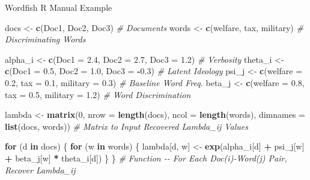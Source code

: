 \documentclass[
  ignorenonframetext,
  aspectratio=169]{beamer}
\newenvironment{Shaded}{\begin{snugshade}}{\end{snugshade}}
\newcommand{\AttributeTok}[1]{\textcolor[rgb]{0.13,0.29,0.53}{#1}}
\newcommand{\CommentTok}[1]{\textcolor[rgb]{0.56,0.35,0.01}{\textit{#1}}}
\newcommand{\ControlFlowTok}[1]{\textcolor[rgb]{0.13,0.29,0.53}{\textbf{#1}}}
\newcommand{\DecValTok}[1]{\textcolor[rgb]{0.00,0.00,0.81}{#1}}
\newcommand{\FloatTok}[1]{\textcolor[rgb]{0.00,0.00,0.81}{#1}}
\newcommand{\FunctionTok}[1]{\textcolor[rgb]{0.13,0.29,0.53}{\textbf{#1}}}
\newcommand{\NormalTok}[1]{#1}
\newcommand{\OtherTok}[1]{\textcolor[rgb]{0.56,0.35,0.01}{#1}}
\newcommand{\SpecialCharTok}[1]{\textcolor[rgb]{0.81,0.36,0.00}{\textbf{#1}}}
\newcommand{\StringTok}[1]{\textcolor[rgb]{0.31,0.60,0.02}{#1}}
\begin{document}
\begin{frame}[fragile]{Wordfish R Manual Example}
\label{wordfish-r-manual-example}
\scriptsize

\begin{Shaded}
\begin{Highlighting}[]
\NormalTok{docs }\OtherTok{\textless{}{-}} \FunctionTok{c}\NormalTok{(}\StringTok{\textquotesingle{}Doc1\textquotesingle{}}\NormalTok{, }\StringTok{\textquotesingle{}Doc2\textquotesingle{}}\NormalTok{, }\StringTok{\textquotesingle{}Doc3\textquotesingle{}}\NormalTok{) }\CommentTok{\# Documents}
\NormalTok{words }\OtherTok{\textless{}{-}} \FunctionTok{c}\NormalTok{(}\StringTok{\textquotesingle{}welfare\textquotesingle{}}\NormalTok{, }\StringTok{\textquotesingle{}tax\textquotesingle{}}\NormalTok{, }\StringTok{\textquotesingle{}military\textquotesingle{}}\NormalTok{) }\CommentTok{\# Discriminating Words}

\NormalTok{alpha\_i }\OtherTok{\textless{}{-}} \FunctionTok{c}\NormalTok{(}\AttributeTok{Doc1 =} \FloatTok{2.4}\NormalTok{, }\AttributeTok{Doc2 =} \FloatTok{2.7}\NormalTok{, }\AttributeTok{Doc3 =} \FloatTok{1.2}\NormalTok{) }\CommentTok{\# Verbosity}
\NormalTok{theta\_i }\OtherTok{\textless{}{-}} \FunctionTok{c}\NormalTok{(}\AttributeTok{Doc1 =} \FloatTok{0.5}\NormalTok{, }\AttributeTok{Doc2 =} \FloatTok{1.0}\NormalTok{, }\AttributeTok{Doc3 =} \SpecialCharTok{{-}}\FloatTok{0.3}\NormalTok{)  }\CommentTok{\# Latent Ideology}
\NormalTok{psi\_j }\OtherTok{\textless{}{-}} \FunctionTok{c}\NormalTok{(}\AttributeTok{welfare =} \FloatTok{0.2}\NormalTok{, }\AttributeTok{tax =} \FloatTok{0.1}\NormalTok{, }\AttributeTok{military =} \FloatTok{0.3}\NormalTok{)  }\CommentTok{\# Baseline Word Freq.}
\NormalTok{beta\_j }\OtherTok{\textless{}{-}} \FunctionTok{c}\NormalTok{(}\AttributeTok{welfare =} \FloatTok{0.8}\NormalTok{, }\AttributeTok{tax =} \FloatTok{0.5}\NormalTok{, }\AttributeTok{military =} \FloatTok{1.2}\NormalTok{) }\CommentTok{\# Word Discrimination}

\NormalTok{lambda }\OtherTok{\textless{}{-}} \FunctionTok{matrix}\NormalTok{(}\DecValTok{0}\NormalTok{, }\AttributeTok{nrow =} \FunctionTok{length}\NormalTok{(docs), }\AttributeTok{ncol =} \FunctionTok{length}\NormalTok{(words),}
                 \AttributeTok{dimnames =} \FunctionTok{list}\NormalTok{(docs, words)) }\CommentTok{\# Matrix to Input Recovered Lambda\_ij Values}

\ControlFlowTok{for}\NormalTok{ (d }\ControlFlowTok{in}\NormalTok{ docs) \{}
  \ControlFlowTok{for}\NormalTok{ (w }\ControlFlowTok{in}\NormalTok{ words) \{}
\NormalTok{    lambda[d, w] }\OtherTok{\textless{}{-}} \FunctionTok{exp}\NormalTok{(alpha\_i[d] }\SpecialCharTok{+}\NormalTok{ psi\_j[w] }\SpecialCharTok{+}\NormalTok{ beta\_j[w] }\SpecialCharTok{*}\NormalTok{ theta\_i[d])}
\NormalTok{  \}}
\NormalTok{\} }\CommentTok{\# Function {-}{-} For Each Doc(i){-}Word(j) Pair, Recover Lambda\_ij}
\end{Highlighting}
\end{Shaded}
\end{frame}
\end{document}
